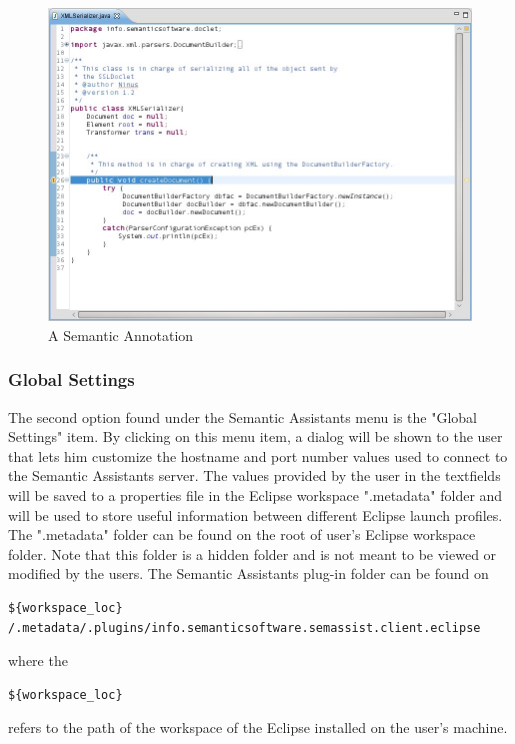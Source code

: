 \begin{figure}[htb]
\begin{center}
  \includegraphics[width=1\textwidth]{pictures/eclipse_annotation.jpg}
  \caption{A Semantic Annotation}
  \label{fig:eclipse_annotation}
\end{center}
\end{figure}

\subsubsection{Global Settings}
The second option found under the Semantic Assistants menu is the "Global
Settings" item. By clicking on this menu item, a dialog will be shown to the
user that lets him customize the hostname and port number values used to connect
to the Semantic Assistants server. The values provided by the user in the
textfields will be saved to a properties file in the Eclipse workspace
".metadata" folder and will be used to store useful information between
different Eclipse launch profiles. The ".metadata" folder can be found on the
root of user's Eclipse workspace folder. Note that this folder is a hidden
folder and is not meant to be viewed or modified by the users. The Semantic
Assistants plug-in folder can be found on
\begin{verbatim}
${workspace_loc}
/.metadata/.plugins/info.semanticsoftware.semassist.client.eclipse
\end{verbatim} 

where the \begin{verbatim}${workspace_loc}\end{verbatim} refers to the path of
the workspace of the Eclipse installed on the user's machine.

